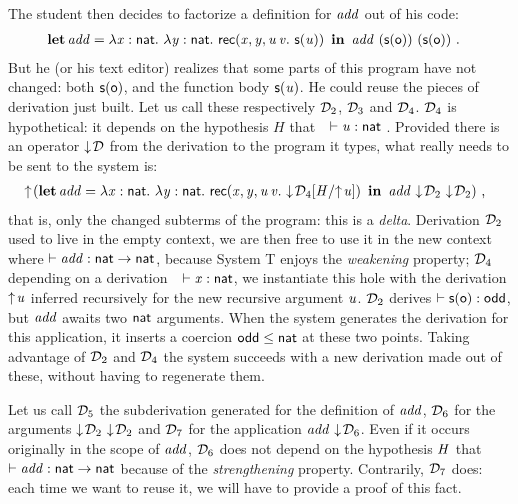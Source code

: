 \documentclass{llncs}
\begin{document}
The student then decides to factorize a definition for $\text{\textit{add}}$ out
of his code:
\begin{align*}
  &\operatorname{\bf let}{{\text{\textit{add}}}}={\lambda{\ensuremath{\text{\textit{x}}}}:{\text{\textsf{nat}}}.\  \lambda{\ensuremath{\text{\textit{y}}}}:{\text{\textsf{nat}}}.\  \text{\textsf{rec}}({\text{\textit{x}}},{\text{\textit{y}}},{\text{\textit{u}}}\,{\text{\textit{v}}}.\ {\text{\textsf{s}} ({\text{\textit{u}}})})}\ \operatorname{\bf in}\ 
  {\text{\textit{add}}}\ {(\text{\textsf{s}} ({\text{\textsf{o}}}))}\ {(\text{\textsf{s}} ({\text{\textsf{o}}}))} \ \text{.}
\end{align*}
But he (or his text editor) realizes that some parts of this program
have not changed: both $\text{\textsf{s}} ({\text{\textsf{o}}})$, and the function body $\text{\textsf{s}} ({\text{\textit{u}}})$. He
could reuse the pieces of derivation just built. Let us call these
respectively $\mathcal D_2$, $\mathcal D_3$ and $\mathcal D_4$. $\mathcal D_4$ is hypothetical: it
depends on the hypothesis $H$ that\ \ $\vdash \text{\textit{u}}:\text{\textsf{nat}}$ .
Provided there is an operator $\downarrow\!{\mathcal D}$ from the derivation to the
program it types, what really needs to be sent to the system is:
\begin{align*}
  &\uparrow\!{}(
    \operatorname{\bf let}{{\text{\textit{add}}}}={\lambda{\ensuremath{\text{\textit{x}}}}:{\text{\textsf{nat}}}.\  \lambda{\ensuremath{\text{\textit{y}}}}:{\text{\textsf{nat}}}.\  \text{\textsf{rec}}({\text{\textit{x}}},{\text{\textit{y}}},{\text{\textit{u}}}\,{\text{\textit{v}}}.\ {\downarrow\!{{\mathcal D_4}[{{\text{\textit{H}}}/{\uparrow\!{\text{\textit{u}}}}}]}})}\ \operatorname{\bf in}\ 
    {\text{\textit{add}}}\ {\downarrow\!{\mathcal D_2}}\ {\downarrow\!{\mathcal D_2}}
  )
\ \text{,}
\end{align*}
that is, only the changed subterms of the program: this is a
\emph{delta}. Derivation $\mathcal D_2$ used to live in the empty context, we
are then free to use it in the new context where
$\vdash\text{\textit{add}}:\text{\textsf{nat}}\to\text{\textsf{nat}}$, because System \sysname T
enjoys the \emph{weakening} property; $\mathcal D_4$ depending on a
derivation\ \ $\vdash\text{\textit{x}}:\text{\textsf{nat}}$, we instantiate this hole with
the derivation $\uparrow\!{\text{\textit{u}}}$ inferred recursively for the new
recursive argument $\text{\textit{u}}$. $\mathcal D_2$ derives $\vdash \text{\textsf{s}} ({\text{\textsf{o}}}) :
\text{\textsf{odd}}$, but $\text{\textit{add}}$ awaits two $\text{\textsf{nat}}$ arguments. When the
system generates the derivation for this application, it inserts a
coercion $\text{\textsf{odd}} \leq \text{\textsf{nat}}$ at these two points. Taking
advantage of $\mathcal D_2$ and $\mathcal D_4$ the system succeeds with a new
derivation made out of these, without having to regenerate them.

Let us call $\mathcal D_5$ the subderivation generated for the definition of
$\text{\textit{add}}$, $\mathcal D_6$ for the arguments
${\downarrow\!{\mathcal D_2}}\ {\downarrow\!{\mathcal D_2}}$ and $\mathcal D_7$ for the application
${\text{\textit{add}}}\  {\downarrow\!{\mathcal D_6}}$. Even if it occurs originally in the
scope of $\text{\textit{add}}$, $\mathcal D_6$ does not depend on the hypothesis $\text{\textit{H}}$ that $\vdash \text{\textit{add}}:\text{\textsf{nat}}\to\text{\textsf{nat}}$ because of the
\emph{strengthening} property. Contrarily, $\mathcal D_7$ does: each time we
want to reuse it, we will have to provide a proof of this fact.
\end{document}
